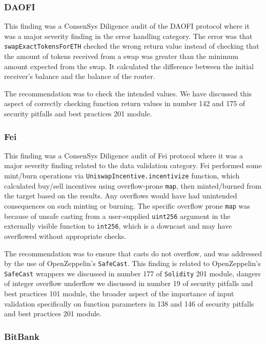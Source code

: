 \subsubsection{DAOFI}\label{daofi}

This finding was a ConsenSys Diligence audit of the DAOFI protocol where
it was a major severity finding in the error handling category. The
error was that \texttt{swapExactTokensForETH} checked the wrong return
value instead of checking that the amount of tokens received from a swap
was greater than the minimum amount expected from the swap. It
calculated the difference between the initial receiver's balance and the
balance of the router.

The recommendation was to check the intended values. We have discussed
this aspect of correctly checking function return values in number 142
and 175 of security pitfalls and best practices 201 module.

\subsubsection{Fei}\label{fei}

This finding was a ConsenSys Diligence audit of Fei protocol where it
was a major severity finding related to the data validation category.
Fei performed some mint/burn operations via
\texttt{UniswapIncentive.incentivize} function, which calculated
buy/sell incentives using overflow-prone \texttt{map}, then
minted/burned from the target based on the results. Any overflows would
have had unintended consequences on such minting or burning. The
specific overflow prone \texttt{map} was because of unsafe casting from
a user-supplied \texttt{uint256} argument in the externally visible
function to \texttt{int256}, which is a downcast and may have overflowed
without appropriate checks.

The recommendation was to ensure that casts do not overflow, and was
addressed by the use of OpenZeppelin's \texttt{SafeCast}. This finding
is related to OpenZeppelin's \texttt{SafeCast} wrappers we discussed in
number 177 of \texttt{Solidity} 201 module, dangers of integer overflow
underflow we discussed in number 19 of security pitfalls and best
practices 101 module, the broader aspect of the importance of input
validation specifically on function parameters in 138 and 146 of
security pitfalls and best practices 201 module.

\subsubsection{BitBank}\label{bitbank}

